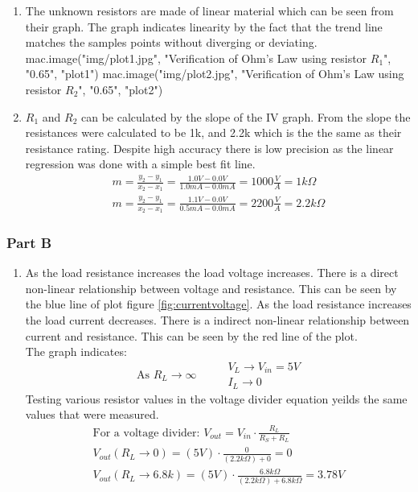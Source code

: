 {{{{{{{\begin{enumerate}
  \item The unknown resistors are made of linear material which can be seen from their graph.
  The graph indicates linearity by the fact that the trend line matches the
  samples points without diverging or deviating.
  {{ mac.image("img/plot1.jpg", "Verification of Ohm's Law using resistor $R_1$", "0.65", "plot1")}}
  {{ mac.image("img/plot2.jpg", "Verification of Ohm's Law using resistor $R_2$", "0.65", "plot2")}}
  \item $R_1$ and $R_2$ can be calculated by the slope of the IV graph.
  From the slope the resistances were calculated to be 1k, and 2.2k which is the
  the same as their resistance rating. Despite high accuracy there is low precision as
  the linear regression was done with a simple best fit line.
  \begin{gather}
    m = \frac{y_2-y_1}{x_2-x_1} = \frac{1.0 V - 0.0 V}{1.0 mA - 0.0 mA} = 1000 \frac{V}{A} = 1 k \Omega \\
    m = \frac{y_2-y_1}{x_2-x_1} = \frac{1.1 V - 0.0 V}{0.5 mA - 0.0 mA} = 2200 \frac{V}{A} = 2.2 k \Omega
  \end{gather}
\end{enumerate}
\vspace{1cm}
\subsubsection{Part B}
\begin{enumerate}
  \item As the load resistance increases the load voltage increases.
  There is a direct non-linear relationship between voltage and resistance. This can be seen by the blue line of plot
  figure \ref{fig:currentvoltage}. As the load resistance increases the load current decreases.
  There is a indirect non-linear relationship between current and resistance. This can be seen by the red line of the plot.\\
  The graph indicates:
  \begin{equation}
    \text{ As } R_L \to \infty \hspace{1cm} \begin{matrix}
    V_L \to V_{in} = 5 V \\
    I_L \to 0
  \end{matrix}
  \end{equation}
  Testing various resistor values in the voltage divider equation yeilds the same
  values that were measured.
  \begin{gather}
    \text{For a voltage divider: } V_{out} = V_{in} \cdot \frac{R_L}{R_S+R_L} \\
    V_{out}(R_L \to 0) = (5 V) \cdot \frac{0}{(2.2 k \Omega)+0} = 0 \\
    V_{out}(R_L \to 6.8k ) = (5 V) \cdot \frac{6.8 k \Omega}{(2.2 k \Omega)+ 6.8 k \Omega} = 3.78V
  \end{gather}




\end{enumerate}}}}}}}}

